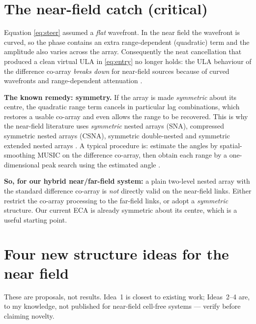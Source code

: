\documentclass[11pt]{article}
\begin{document}
\section{The near-field catch (critical)}

Equation \eqref{eq:steer} assumed a \emph{flat} wavefront. In the near field the wavefront is curved,
so the phase contains an extra range-dependent (quadratic) term and the amplitude also varies across
the array. Consequently the neat cancellation that produced a clean virtual ULA in \eqref{eq:entry}
no longer holds: the ULA behaviour of the difference co-array \emph{breaks down} for near-field
sources because of curved wavefronts and range-dependent attenuation
\cite{wang2016csna,zhang2019symdouble}.

\textbf{The known remedy: symmetry.} If the array is made \emph{symmetric} about its centre, the
quadratic range term cancels in particular lag combinations, which restores a usable co-array and
even allows the range to be recovered. This is why the near-field literature uses \emph{symmetric}
nested arrays (SNA), compressed symmetric nested arrays (CSNA), symmetric double-nested and symmetric
extended nested arrays \cite{wang2016csna,zhang2019symdouble,chen2023hybrid}. A typical procedure is:
estimate the angles by spatial-smoothing MUSIC on the difference co-array, then obtain each range by
a one-dimensional peak search using the estimated angle \cite{zhang2019symdouble}.

\begin{keybox}
\textbf{So, for our hybrid near/far-field system:} a plain two-level nested array with the standard
difference co-array is \emph{not} directly valid on the near-field links. Either restrict the
co-array processing to the far-field links, or adopt a \emph{symmetric} structure. Our current ECA is
already symmetric about its centre, which is a useful starting point.
\end{keybox}

\section{Four new structure ideas for the near field}

These are proposals, not results. Idea~1 is closest to existing work; Ideas~2--4 are, to my
knowledge, not published for near-field cell-free systems --- verify before claiming novelty.
\end{document}
